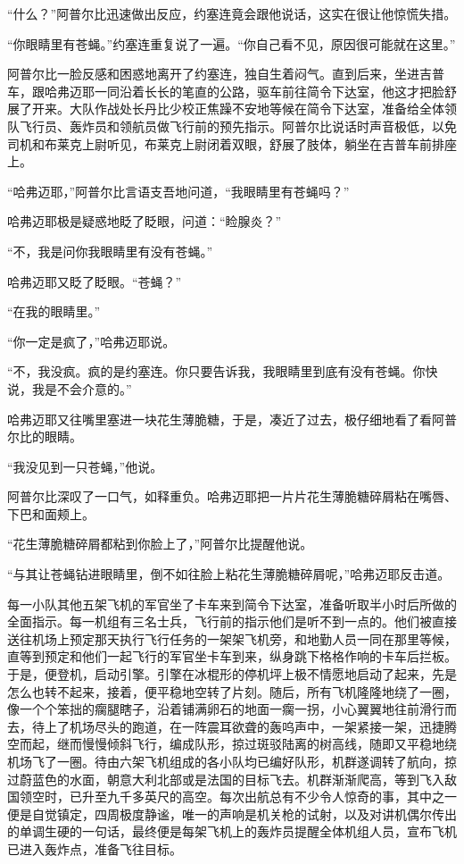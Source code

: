     “什么？”阿普尔比迅速做出反应，约塞连竟会跟他说话，这实在很让他惊慌失措。

    “你眼睛里有苍蝇。”约塞连重复说了一遍。“你自己看不见，原因很可能就在这里。”

    阿普尔比一脸反感和困惑地离开了约塞连，独自生着闷气。直到后来，坐进吉普车，跟哈弗迈耶一同沿着长长的笔直的公路，驱车前往简令下达室，他这才把脸舒展了开来。大队作战处长丹比少校正焦躁不安地等候在简令下达室，准备给全体领队飞行员、轰炸员和领航员做飞行前的预先指示。阿普尔比说话时声音极低，以免司机和布莱克上尉听见，布莱克上尉闭着双眼，舒展了肢体，躺坐在吉普车前排座上。

    “哈弗迈耶，”阿普尔比言语支吾地问道，“我眼睛里有苍蝇吗？”

    哈弗迈耶极是疑惑地眨了眨眼，问道：“睑腺炎？”

    “不，我是问你我眼睛里有没有苍蝇。”

    哈弗迈耶又眨了眨眼。“苍蝇？”

    “在我的眼睛里。”

    “你一定是疯了，”哈弗迈耶说。

    “不，我没疯。疯的是约塞连。你只要告诉我，我眼睛里到底有没有苍蝇。你快说，我是不会介意的。”

    哈弗迈耶又往嘴里塞进一块花生薄脆糖，于是，凑近了过去，极仔细地看了看阿普尔比的眼睛。

    “我没见到一只苍蝇，”他说。

    阿普尔比深叹了一口气，如释重负。哈弗迈耶把一片片花生薄脆糖碎屑粘在嘴唇、下巴和面颊上。

    “花生薄脆糖碎屑都粘到你脸上了，”阿普尔比提醒他说。

    “与其让苍蝇钻进眼睛里，倒不如往脸上粘花生薄脆糖碎屑呢，”哈弗迈耶反击道。

    每一小队其他五架飞机的军官坐了卡车来到简令下达室，准备听取半小时后所做的全面指示。每一机组有三名士兵，飞行前的指示他们是听不到一点的。他们被直接送往机场上预定那天执行飞行任务的一架架飞机旁，和地勤人员一同在那里等候，直等到预定和他们一起飞行的军官坐卡车到来，纵身跳下格格作响的卡车后拦板。于是，便登机，启动引擎。引擎在冰棍形的停机坪上极不情愿地启动了起来，先是怎么也转不起来，接着，便平稳地空转了片刻。随后，所有飞机隆隆地绕了一圈，像一个个笨拙的瘸腿瞎子，沿着铺满卵石的地面一瘸一拐，小心翼翼地往前滑行而去，待上了机场尽头的跑道，在一阵震耳欲聋的轰呜声中，一架紧接一架，迅捷腾空而起，继而慢慢倾斜飞行，编成队形，掠过斑驳陆离的树高线，随即又平稳地绕机场飞了一圈。待由六架飞机组成的各小队均已编好队形，机群遂调转了航向，掠过蔚蓝色的水面，朝意大利北部或是法国的目标飞去。机群渐渐爬高，等到飞入敌国领空时，已升至九千多英尺的高空。每次出航总有不少令人惊奇的事，其中之一便是自觉镇定，四周极度静谧，唯一的声响是机关枪的试射，以及对讲机偶尔传出的单调生硬的一句话，最终便是每架飞机上的轰炸员提醒全体机组人员，宣布飞机已进入轰炸点，准备飞往目标。

